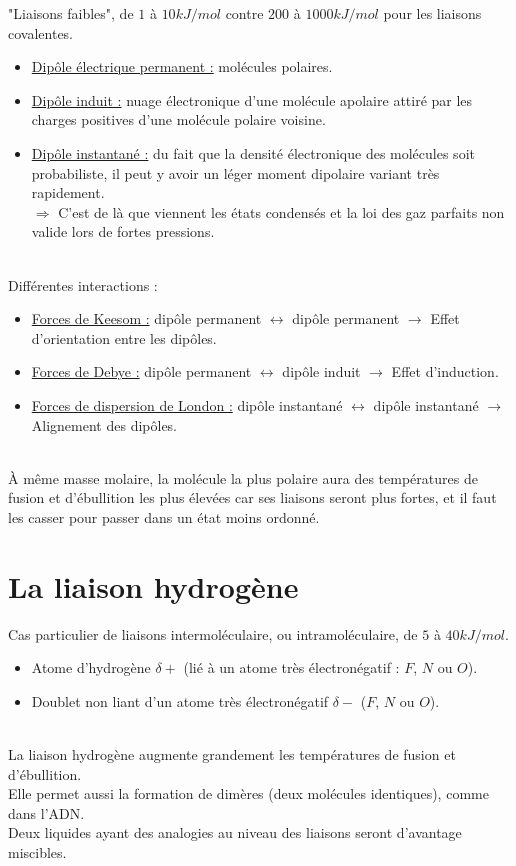 \documentclass[13pt, twoside, a4paper, french, tikz]{report}
\begin{document}
    "Liaisons faibles", de $1$ à $10 kJ/mol$ contre $200$ à $1000 kJ/mol$ pour les liaisons covalentes.
    \begin{itemize}
        \item \underline{Dipôle électrique permanent :} molécules polaires.
        \item \underline{Dipôle induit :} nuage électronique d'une molécule apolaire attiré par les charges positives d'une molécule polaire voisine.
        \item \underline{Dipôle instantané :} du fait que la densité électronique des molécules soit probabiliste, il peut y avoir un léger moment dipolaire variant très rapidement.\\
        $\Rightarrow$ C'est de là que viennent les états condensés et la loi des gaz parfaits non valide lors de fortes pressions.
    \end{itemize}
    \vspace{5pt}\\
    Différentes interactions :
    \begin{itemize}
        \item \underline{Forces de Keesom :} dipôle permanent $\leftrightarrow$ dipôle permanent $\rightarrow$ Effet d'orientation entre les dipôles.
        \item \underline{Forces de Debye :} dipôle permanent $\leftrightarrow$ dipôle induit $\rightarrow$ Effet d'induction.
        \item \underline{Forces de dispersion de London :} dipôle instantané $\leftrightarrow$ dipôle instantané $\rightarrow$ Alignement des dipôles.
    \end{itemize}
    \ \\
    À même masse molaire, la molécule la plus polaire aura des températures de fusion et d'ébullition les plus élevées car ses liaisons seront plus fortes, et il faut les casser pour passer dans un état moins ordonné.


    \section{La liaison hydrogène}\label{sec:la-liaison-hydrogene}

    Cas particulier de liaisons intermoléculaire, ou intramoléculaire, de $5$ à $40 kJ/mol$.
    \begin{itemize}
        \item Atome d'hydrogène $\delta +$ (lié à un atome très électronégatif : $F$, $N$ ou $O$).
        \item Doublet non liant d'un atome très électronégatif $\delta -$ ($F$, $N$ ou $O$).
    \end{itemize}
    \ \\
    La liaison hydrogène augmente grandement les températures de fusion et d'ébullition.\\
    Elle permet aussi la formation de dimères (deux molécules identiques), comme dans l'ADN.\\
    Deux liquides ayant des analogies au niveau des liaisons seront d'avantage miscibles.
\end{document}
